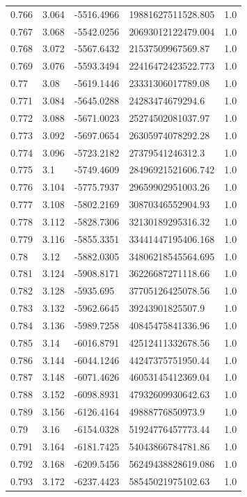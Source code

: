 \begin{tabular}{lllll}
0.766 & 3.064 & -5516.4966 & 19881627511528.805 & 1.0 \\
0.767 & 3.068 & -5542.0256 & 20693012122479.004 & 1.0 \\
0.768 & 3.072 & -5567.6432 & 21537509967569.87 & 1.0 \\
0.769 & 3.076 & -5593.3494 & 22416472423522.773 & 1.0 \\
0.77 & 3.08 & -5619.1446 & 23331306017789.08 & 1.0 \\
0.771 & 3.084 & -5645.0288 & 24283474679294.6 & 1.0 \\
0.772 & 3.088 & -5671.0023 & 25274502081037.97 & 1.0 \\
0.773 & 3.092 & -5697.0654 & 26305974078292.28 & 1.0 \\
0.774 & 3.096 & -5723.2182 & 27379541246312.3 & 1.0 \\
0.775 & 3.1 & -5749.4609 & 28496921521606.742 & 1.0 \\
0.776 & 3.104 & -5775.7937 & 29659902951003.26 & 1.0 \\
0.777 & 3.108 & -5802.2169 & 30870346552904.93 & 1.0 \\
0.778 & 3.112 & -5828.7306 & 32130189295316.32 & 1.0 \\
0.779 & 3.116 & -5855.3351 & 33441447195406.168 & 1.0 \\
0.78 & 3.12 & -5882.0305 & 34806218545564.695 & 1.0 \\
0.781 & 3.124 & -5908.8171 & 36226687271118.66 & 1.0 \\
0.782 & 3.128 & -5935.695 & 37705126425078.56 & 1.0 \\
0.783 & 3.132 & -5962.6645 & 39243901825507.9 & 1.0 \\
0.784 & 3.136 & -5989.7258 & 40845475841336.96 & 1.0 \\
0.785 & 3.14 & -6016.8791 & 42512411332678.56 & 1.0 \\
0.786 & 3.144 & -6044.1246 & 44247375751950.44 & 1.0 \\
0.787 & 3.148 & -6071.4626 & 46053145412369.04 & 1.0 \\
0.788 & 3.152 & -6098.8931 & 47932609930642.63 & 1.0 \\
0.789 & 3.156 & -6126.4164 & 49888776850973.9 & 1.0 \\
0.79 & 3.16 & -6154.0328 & 51924776457773.44 & 1.0 \\
0.791 & 3.164 & -6181.7425 & 54043866784781.86 & 1.0 \\
0.792 & 3.168 & -6209.5456 & 56249438828619.086 & 1.0 \\
0.793 & 3.172 & -6237.4423 & 58545021975102.63 & 1.0 \\

\end{tabular}
